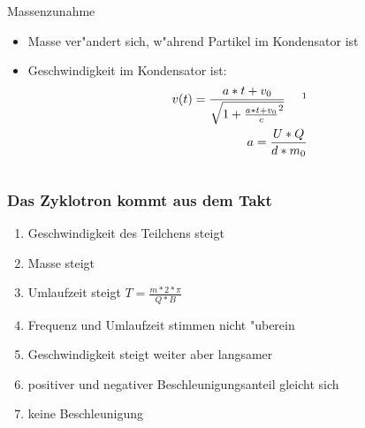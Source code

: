 \documentclass{beamer}
\begin{document}
\begin{frame}
\begin{columns}
\begin{column}{0.33\textwidth}
\begin{block}{Massenzunahme}
\begin{itemize}
\begin{itemize}
            \item Masse ver"andert sich, w"ahrend Partikel im Kondensator ist
            \item Geschwindigkeit im Kondensator ist:
              \begin{eqnarray}
                v(t)=\frac{a * t + v_0}{\sqrt{1 + \frac{a * t + v_0}{c}^2}}~~~~\footnotemark\\
                a = \frac{U * Q}{d * m_0}
              \end{eqnarray}
          \end{itemize}
        \end{itemize}
      \end{block}
    \end{column}
  \end{columns}
\end{frame}

\begin{frame}
  \frametitle{Das Zyklotron kommt aus dem Takt}
  \begin{enumerate}
    \item <1-> Geschwindigkeit des Teilchens steigt
    \item <2-> Masse steigt
    \item <3-> Umlaufzeit steigt $ T = \frac{m * 2 * \pi }{Q * B} $
    \item <4-> Frequenz und Umlaufzeit stimmen nicht "uberein
    \item <5-> Geschwindigkeit steigt weiter aber langsamer
    \item <6-> positiver und negativer Beschleunigungsanteil gleicht sich
    \item <7-> keine Beschleunigung
  \end{enumerate}
\end{frame}
\end{document}
